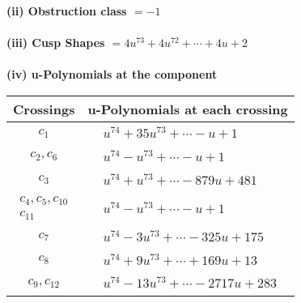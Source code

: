 \documentclass[1p]{elsarticle_modified}
\theoremstyle{definition}
\begin{document}
\flushleft \textbf{(ii) Obstruction class $= -1$}\\~\\
\flushleft \textbf{(iii) Cusp Shapes $= 4 u^{73}+4 u^{72}+\cdots+4 u+2$}\\~\\
\newpage\renewcommand{\arraystretch}{1}
\flushleft \textbf{(iv) u-Polynomials at the component}\newline \\
\begin{tabular}{m{50pt}|m{274pt}}
Crossings & \hspace{64pt}u-Polynomials at each crossing \\
\hline $$\begin{aligned}c_{1}\end{aligned}$$&$\begin{aligned}
&u^{74}+35 u^{73}+\cdots- u+1
\end{aligned}$\\
\hline $$\begin{aligned}c_{2},c_{6}\end{aligned}$$&$\begin{aligned}
&u^{74}- u^{73}+\cdots- u+1
\end{aligned}$\\
\hline $$\begin{aligned}c_{3}\end{aligned}$$&$\begin{aligned}
&u^{74}+u^{73}+\cdots-879 u+481
\end{aligned}$\\
\hline $$\begin{aligned}c_{4},c_{5},c_{10}\\c_{11}\end{aligned}$$&$\begin{aligned}
&u^{74}- u^{73}+\cdots- u+1
\end{aligned}$\\
\hline $$\begin{aligned}c_{7}\end{aligned}$$&$\begin{aligned}
&u^{74}-3 u^{73}+\cdots-325 u+175
\end{aligned}$\\
\hline $$\begin{aligned}c_{8}\end{aligned}$$&$\begin{aligned}
&u^{74}+9 u^{73}+\cdots+169 u+13
\end{aligned}$\\
\hline $$\begin{aligned}c_{9},c_{12}\end{aligned}$$&$\begin{aligned}
&u^{74}-13 u^{73}+\cdots-2717 u+283
\end{aligned}$\\
\hline
\end{tabular}\\~\\
\end{document}

